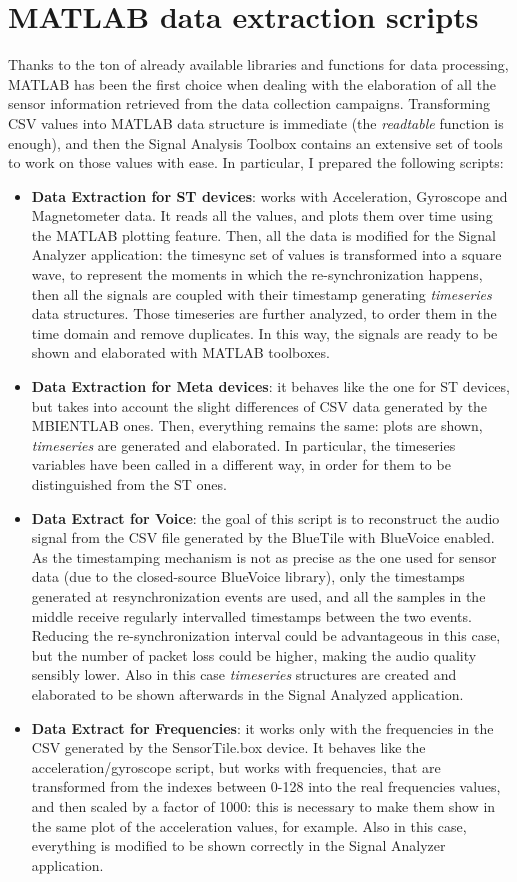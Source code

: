 \section{MATLAB data extraction scripts}
Thanks to the ton of already available libraries and functions for data processing, MATLAB has been the first choice when dealing with the elaboration of all the sensor information retrieved from the data collection campaigns. Transforming CSV values into MATLAB data structure is immediate (the \textit{readtable} function is enough), and then the Signal Analysis Toolbox contains an extensive set of tools to work on those values with ease. In particular, I prepared the following scripts:
\begin{itemize} 
    \item \textbf{Data Extraction for ST devices}: works with Acceleration, Gyroscope and Magnetometer data. It reads all the values, and plots them over time using the MATLAB plotting feature. Then, all the data is modified for the Signal Analyzer application: the timesync set of values is transformed into a square wave, to represent the moments in which the re-synchronization happens, then all the signals are coupled with their timestamp generating \textit{timeseries} data structures. Those timeseries are further analyzed, to order them in the time domain and remove duplicates. In this way, the signals are ready to be shown and elaborated with MATLAB toolboxes.
    \item \textbf{Data Extraction for Meta devices}: it behaves like the one for ST devices, but takes into account the slight differences of CSV data generated by the MBIENTLAB ones. Then, everything remains the same: plots are shown, \textit{timeseries} are generated and elaborated. In particular, the timeseries variables have been called in a different way, in order for them to be distinguished from the ST ones.
    \item \textbf{Data Extract for Voice}: the goal of this script is to reconstruct the audio signal from the CSV file generated by the BlueTile with BlueVoice enabled. As the timestamping mechanism is not as precise as the one used for sensor data (due to the closed-source BlueVoice library), only the timestamps generated at resynchronization events are used, and all the samples in the middle receive regularly intervalled timestamps between the two events. Reducing the re-synchronization interval could be advantageous in this case, but the number of packet loss could be higher, making the audio quality sensibly lower. Also in this case \textit{timeseries} structures are created and elaborated to be shown afterwards in the Signal Analyzed application.
    \item \textbf{Data Extract for Frequencies}: it works only with the frequencies in the CSV generated by the SensorTile.box device. It behaves like the acceleration/gyroscope script, but works with frequencies, that are transformed from the indexes between 0-128 into the real frequencies values, and then scaled by a factor of 1000: this is necessary to make them show in the same plot of the acceleration values, for example. Also in this case, everything is modified to be shown correctly in the Signal Analyzer application. 
\end{itemize}
